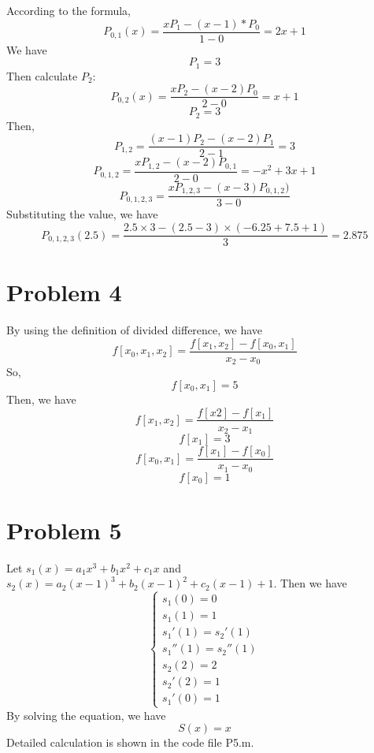 \documentclass[11pt,a4paper]{report}
\theoremstyle{remark}
\begin{document}
According to the formula,
\[
P_{0,1}(x)=\frac{xP_1-(x-1)*P_0}{1-0}=2x+1
\]
We have
\[
P_1=3
\]
Then calculate $P_2$:
\[
P_{0,2}(x)=\frac{xP_2-(x-2)P_0}{2-0}=x+1
\]
\[
P_2=3\]
Then,
\[
P_{1,2}=\frac{(x-1)P_2-(x-2)P_1}{2-1}=3
\]
\[
P_{0,1,2}=\frac{xP_{1,2}-(x-2)P_{0,1}}{2-0}=-x^2+3x+1\]
\[
P_{0,1,2,3}=\frac{xP_{1,2,3}-(x-3)P_{0,1,2})}{3-0}
\]
Substituting the value, we have
\[
P_{0,1,2,3}(2.5)=\frac{2.5\times3-(2.5-3)\times(-6.25+7.5+1)}{3}=2.875
\]
\section*{Problem 4}
By using the definition of divided difference, we have
\[
f[x_0,x_1,x_2]=\frac{f[x_1,x_2]-f[x_0,x_1]}{x_2-x_0}
\]
So,
\[
f[x_0,x_1]=5\]
Then, we have
\[
f[x_1,x_2]=\frac{f[x2]-f[x_1]}{x_2-x_1}\]
\[
f[x_1]=3\]
\[
f[x_0,x_1]=\frac{f[x_1]-f[x_0]}{x_1-x_0}\]
\[
f[x_0]=1\]
\section*{Problem 5}
Let $s_1(x)=a_1x^3+b_1x^2+c_1x$ and $s_2(x)=a_2(x-1)^3+b_2(x-1)^2+c_2(x-1)+1$. Then we have
\[
\begin{cases}
s_1(0)=0\\
s_1(1)=1\\
s_1'(1)=s_2'(1)\\
s_1''(1)=s_2''(1)\\
s_2(2)=2\\
s_2'(2)=1\\
s_1'(0)=1 
\end{cases}
\]
By solving the equation, we have
\[
S(x)=x
\]
Detailed calculation is shown in the code file P5.m.
\end{document}
